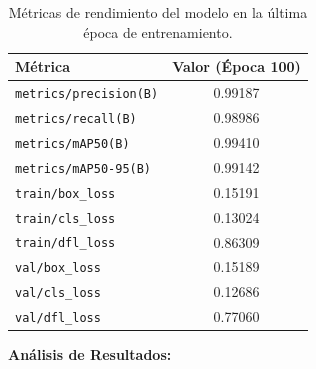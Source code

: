 \documentclass{article}
\begin{document}
\begin{table}[h!]
    \centering
    \begin{tabular}{lc}
        \toprule
        \textbf{Métrica} & \textbf{Valor (Época 100)} \\
        \midrule
        \texttt{metrics/precision(B)} & 0.99187 \\
        \texttt{metrics/recall(B)} & 0.98986 \\
        \texttt{metrics/mAP50(B)} & 0.99410 \\
        \texttt{metrics/mAP50-95(B)} & 0.99142 \\
        \texttt{train/box\_loss} & 0.15191 \\
        \texttt{train/cls\_loss} & 0.13024 \\
        \texttt{train/dfl\_loss} & 0.86309 \\
        \texttt{val/box\_loss} & 0.15189 \\
        \texttt{val/cls\_loss} & 0.12686 \\
        \texttt{val/dfl\_loss} & 0.77060 \\
        \bottomrule
    \end{tabular}
    \caption{Métricas de rendimiento del modelo en la última época de entrenamiento.}
    \label{tab:metrics}
\end{table}

\textbf{Análisis de Resultados:}
\end{document}
